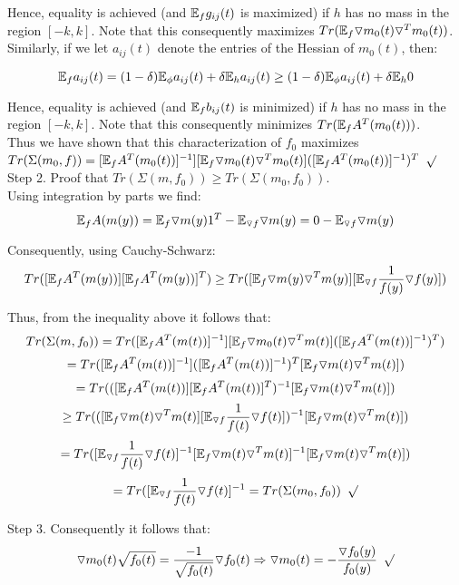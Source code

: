 \documentclass[12pt]{article}
\begin{document}
\noindent
Hence, equality is achieved (and $\mathbb{E}_f g_{ij}(t)$ is maximized) if $h$ has no mass in the region $[-k,k]$. Note that this consequently maximizes $Tr(\mathbb{E}_f \triangledown m_0(t) \triangledown^Tm_0(t))$. \\

\noindent
Similarly, if we let  $a_{ij}(t)$ denote the entries of the Hessian of $m_0(t)$, then:

$$\mathbb{E}_f a_{ij}(t)
= (1-\delta) \mathbb{E}_\phi a_{ij}(t)+\delta \mathbb{E}_h a_{ij}(t)
\geq (1-\delta) \mathbb{E}_\phi a_{ij}(t)+\delta \mathbb{E}_h 0$$

\noindent
Hence, equality is achieved (and $\mathbb{E}_f b_{ij}(t)$ is minimized) if $h$ has no mass in the region $[-k,k]$. Note that this consequently minimizes $Tr(\mathbb{E}_f A^T(m_0(t)) )$. \\

\noindent
Thus we have shown that this characterization of $f_0$ maximizes\\
$Tr(\Sigma(m_0,f)) = [\mathbb{E}_f A^T(m_0(t))]^{-1}] [\mathbb{E}_f \triangledown m_0(t) \triangledown^T m_0(t)] ([\mathbb{E}_f A^T(m_0(t))]^{-1})^T$
$\surd$\\

\noindent
Step 2. Proof that $Tr(\Sigma(m,f_0)) \geq Tr(\Sigma(m_0,f_0))$.\\
Using integration by parts we find:
$$\mathbb{E}_f A(m(y)) = \mathbb{E}_f \triangledown m(y) 1^T  - \mathbb{E}_{\triangledown f} \triangledown m(y) = 0 - \mathbb{E}_{\triangledown f} \triangledown m(y)$$

\noindent
Consequently, using Cauchy-Schwarz:
$$Tr( [\mathbb{E}_f A^T(m(y))][\mathbb{E}_f A^T(m(y))]^T) 
\geq Tr( [\mathbb{E}_f \triangledown m(y) \triangledown^T m(y)][\mathbb{E}_{\triangledown f} \frac{1}{f(y)}\triangledown f(y)] )$$

\noindent
Thus, from the inequality above it follows that:
$$Tr(\Sigma(m,f_0)) = Tr([\mathbb{E}_f A^T(m(t))]^{-1}] [\mathbb{E}_f \triangledown m_0(t) \triangledown^T m(t)] ([\mathbb{E}_f A^T(m(t))]^{-1})^T)$$
$$= Tr([\mathbb{E}_f A^T(m(t))]^{-1}] ([\mathbb{E}_f A^T(m(t))]^{-1})^T [\mathbb{E}_f \triangledown m(t) \triangledown^T m(t)])$$
$$= Tr( ([\mathbb{E}_f A^T(m(t))][\mathbb{E}_f A^T(m(t))]^T)^{-1} [\mathbb{E}_f \triangledown m(t) \triangledown^T m(t)])$$
$$\geq Tr(  ([\mathbb{E}_f \triangledown m(t) \triangledown^T m(t)][\mathbb{E}_{\triangledown f} \frac{1}{f(t)}\triangledown f(t)])^{-1} [\mathbb{E}_f \triangledown m(t) \triangledown^T m(t)])$$
$$= Tr( [\mathbb{E}_{\triangledown f} \frac{1}{f(t)}\triangledown f(t)]^{-1} [\mathbb{E}_f \triangledown m(t) \triangledown^T m(t)]^{-1} [\mathbb{E}_f \triangledown m(t) \triangledown^T m(t)] )$$
$$= Tr( [\mathbb{E}_{\triangledown f} \frac{1}{f(t)}\triangledown f(t)]^{-1} = Tr(\Sigma(m_0,f_0)) \hspace{5 pt} \surd$$

\pagebreak
\noindent
Step 3. Consequently it follows that:
$$\triangledown m_0(t) \sqrt{f_0(t)} = \frac{-1}{\sqrt{f_0(t)}} \triangledown f_0(t)
\Rightarrow \triangledown m_0(t) = -\frac{\triangledown f_0(y)}{f_0(y)} \hspace{5 pt} \surd$$
\end{document}
